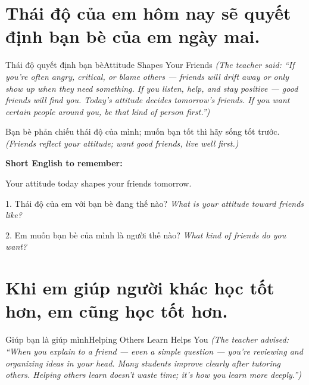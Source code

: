 \section{Thái độ của em hôm nay sẽ quyết định bạn bè của em ngày mai.}
\begin{truyen}{Thái độ quyết định bạn bè}{Attitude Shapes Your Friends}
\textit{(The teacher said: ``If you're often angry, critical, or blame others — friends will drift away or only show up when they need something. If you listen, help, and stay positive — good friends will find you. Today's attitude decides tomorrow's friends. If you want certain people around you, be that kind of person first.'')}
\end{truyen}

\begin{baihoc}
Bạn bè phản chiếu thái độ của mình; muốn bạn tốt thì hãy sống tốt trước.
\textit{(Friends reflect your attitude; want good friends, live well first.)}
\end{baihoc}

\begin{ghinhoanh}
\textbf{Short English to remember:}

Your attitude today shapes your friends tomorrow.

\end{ghinhoanh}

\begin{tuhocnhanh}
1. Thái độ của em với bạn bè đang thế nào? \textit{What is your attitude toward friends like?}

2. Em muốn bạn bè của mình là người thế nào? \textit{What kind of friends do you want?}
\end{tuhocnhanh}
\ngancach

\section{Khi em giúp người khác học tốt hơn, em cũng học tốt hơn.}
\begin{truyen}{Giúp bạn là giúp mình}{Helping Others Learn Helps You}
\textit{(The teacher advised: ``When you explain to a friend — even a simple question — you're reviewing and organizing ideas in your head. Many students improve clearly after tutoring others. Helping others learn doesn't waste time; it's how you learn more deeply.'')}
\end{truyen}


